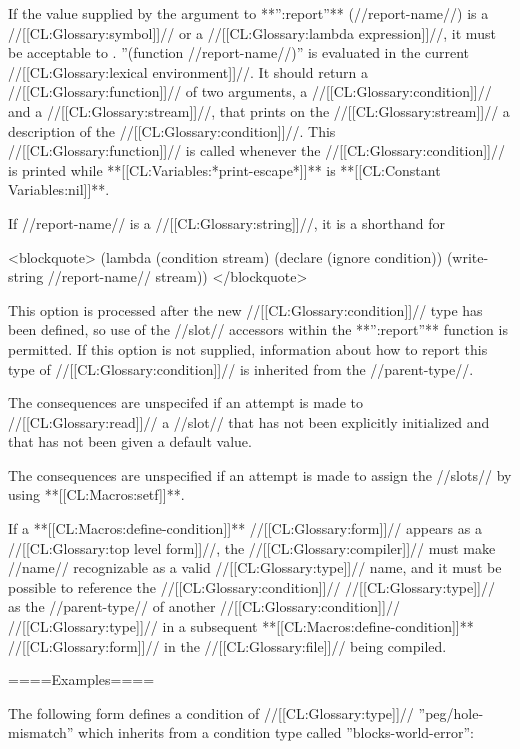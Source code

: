 If the value supplied by the argument to **'':report''** (//report-name//) is a //[[CL:Glossary:symbol]]// or a //[[CL:Glossary:lambda expression]]//, it must be acceptable to . ''(function //report-name//)'' is evaluated in the current //[[CL:Glossary:lexical environment]]//. It should return a //[[CL:Glossary:function]]// of two arguments, a //[[CL:Glossary:condition]]// and a //[[CL:Glossary:stream]]//, that prints on the //[[CL:Glossary:stream]]// a description of the //[[CL:Glossary:condition]]//. This //[[CL:Glossary:function]]// is called whenever the //[[CL:Glossary:condition]]// is printed while **[[CL:Variables:*print-escape*]]** is **[[CL:Constant Variables:nil]]**.

If //report-name// is a //[[CL:Glossary:string]]//, it is a shorthand for

<blockquote> (lambda (condition stream) (declare (ignore condition)) (write-string //report-name// stream)) </blockquote>

This option is processed after the new //[[CL:Glossary:condition]]// type has been defined, so use of the //slot// accessors within the **'':report''** function is permitted. If this option is not supplied, information about how to report this type of //[[CL:Glossary:condition]]// is inherited from the //parent-type//.

\endlist

The consequences are unspecifed if an attempt is made to //[[CL:Glossary:read]]// a //slot// that has not been explicitly initialized and that has not been given a default value.

The consequences are unspecified if an attempt is made to assign the //slots// by using **[[CL:Macros:setf]]**.

If a **[[CL:Macros:define-condition]]** //[[CL:Glossary:form]]// appears as a //[[CL:Glossary:top level form]]//, the //[[CL:Glossary:compiler]]// must make //name// recognizable as a valid //[[CL:Glossary:type]]// name, and it must be possible to reference the //[[CL:Glossary:condition]]// //[[CL:Glossary:type]]// as the //parent-type// of another //[[CL:Glossary:condition]]// //[[CL:Glossary:type]]// in a subsequent **[[CL:Macros:define-condition]]** //[[CL:Glossary:form]]// in the //[[CL:Glossary:file]]// being compiled.

====Examples====

The following form defines a condition of //[[CL:Glossary:type]]// ''peg/hole-mismatch'' which inherits from a condition type called ''blocks-world-error'':

